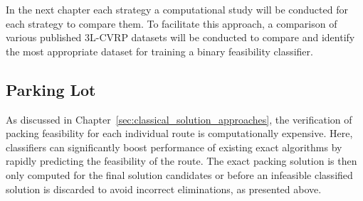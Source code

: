 \parbreak

In the next chapter each strategy a computational study will be conducted for each strategy to compare them. To facilitate this approach,
a comparison of various published \gls{3L-CVRP} datasets will be conducted to compare and identify the most appropriate
dataset for training a binary feasibility classifier.

\subsection*{Parking Lot}
As discussed in Chapter~\ref{sec:classical_solution_approaches}, the verification of
packing feasibility for each individual route is computationally expensive.
Here, classifiers can significantly boost performance of existing exact algorithms by rapidly predicting the feasibility of the route. The
exact packing solution is then only computed for the final solution candidates or before an infeasible classified solution
is discarded to avoid incorrect eliminations, as presented above.
